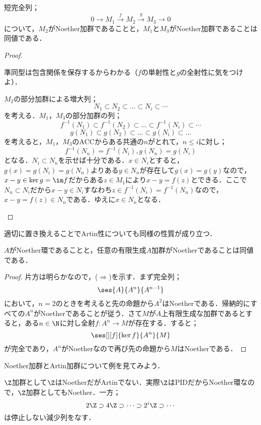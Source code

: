 \begin{prop}
	短完全列；
	\[0\longrightarrow M_1\overset{f}{\longrightarrow}M_2\overset{g}{\longrightarrow}M_3\longrightarrow0\]
	について，$M_2$がNoether加群であることと，$M_1$と$M_3$がNoether加群であることは同値である．
\end{prop}
\begin{proof}
	\begin{eqv}
		\item 準同型は包含関係を保存するからわかる（$f$の単射性と$g$の全射性に気をつけよ）．
		\item $M_2$の部分加群による増大列；
		\[N_1\subset N_2\subset\dots\subset N_i\subset\cdots\]
		を考える．$M_1，M_3$の部分加群の列；
		\[f^{-1}(N_1)\subset f^{-1}(N_2)\subset\dots\subset f^{-1}(N_i)\subset\cdots\]
		\[g(N_1)\subset g(N_2)\subset\dots\subset g(N_i)\subset\dots\]
		を考えると，$M_1，M_3$のACCからある共通の$n$がとれて，$n\leq i$に対し；
		\[f^{-1}(N_n)=f^{-1}(N_i), g(N_n)=g(N_i)\]
		となる．$N_i\subset N_n$を示せば十分である．$x\in N_i$とすると，$g(x)=g(N_i)=g(N_n)$よりある$y\in N_n$が存在して$g(x)=g(y)$なので，$x-y\in\ker g=\im f$だからある$z\in M_1$により$x-y=f(z)$とできる．ここで$N_n\subset N_i$だから$x-y\in N_i$すなわち$z\in f^{-1}(N_i)=f^{-1}(N_n)$なので，$x-y=f(z)\in N_n$である．ゆえに$x\in N_n$となる．
	\end{eqv}
\end{proof}

適切に置き換えることでArtin性についても同様の性質が成り立つ．
\begin{prop}
	$A$がNoether環であることと，任意の有限生成$A$加群がNoetherであることは同値である．
\end{prop}
\begin{proof}
		片方は明らかなので，($\Longrightarrow$)を示す．まず完全列；
		\[\ses{A}{A^n}{A^{n-1}}\]
		において，$n=2$のときを考えると先の命題から$A^2$はNoetherである．帰納的にすべての$A^n$がNoetherであることが従う．さて$M$が$A$上有限生成な加群であるとすると，ある$n\in\N$に対し全射$f:A^n\to M$が存在する．すると；
		\[\ses[][f]{\ker f}{A^n}{M}\]
		が完全であり，$A^n$がNoetherなので再び先の命題から$M$はNoetherである．
\end{proof}

Noether加群とArtin加群について例を見てみよう．

\begin{ex}
	$\Z$加群として$\Z$はNoetherだがArtinでない．実際$\Z$はPIDだからNoether環なので，$\Z$加群としてもNoether．一方；
	\[2\Z\supset4\Z\supset\dots\supset2^i\Z\supset\cdots\]
	は停止しない減少列をなす．
\end{ex}	

